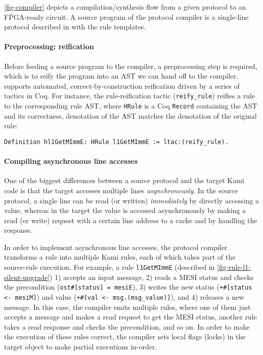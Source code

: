 \documentclass[sigplan,10pt,review,anonymous,screen]{acmart}\settopmatter{printfolios=true,printccs=false,printacmref=false}
\def\slstinline{\lstinline[basicstyle=\ttfamily\small]}
\begin{document}
\autoref{fig-compiler} depicts a compilation/synthesis flow from a given \hemiola{} protocol to an FPGA-ready circuit.
A source program of the protocol compiler is a single-line protocol described in \hemiola{} with the rule templates.

\paragraph{Preprocessing: reification}

Before feeding a \hemiola{} source program to the compiler, a preprocessing step is required, which is to reify the program into an AST we can hand off to the compiler.
\hemiola{} supports automated, correct-by-construction reification driven by a series of tactics in Coq.
For instance, the rule-reification tactic (\slstinline{reify_rule}) reifies a \hemiola{} rule to the corresponding rule AST, where \slstinline{HRule} is a Coq \slstinline{Record} containing the AST and its correctness, \ie{} denotation of the AST matches the denotation of the original rule:
\begin{lstlisting}[numbers=none, frame=none, xleftmargin=10pt]
Definition hl1GetMImmE: HRule l1GetMImmE := ltac:(reify_rule).
\end{lstlisting}

\paragraph{Compiling asynchronous line accesses}

One of the biggest differences between a source \hemiola{} protocol and the target Kami code is that the target accesses multiple lines \emph{asynchronously}.
In the source protocol, a single line can be read (or written) \emph{immediately} by directly accessing a value, whereas in the target the value is accessed asynchronously by making a read (or write) request with a certain line address to a cache and by handling the response.

In order to implement asynchronous line accesses, the protocol compiler transforms a \hemiola{} rule into multiple Kami rules, each of which takes part of the source-rule execution.
For example, a \hemiola{} rule \slstinline{l1GetMImmE} (described in \autoref{fig-rule-l1-silent-upgrade}) 1) accepts an input message, 2) reads a MESI status and checks the precondition (\slstinline{ost#[status] = mesiE}), 3) writes the new status (\slstinline{+#[status <- mesiM]}) and value (\slstinline{+#[val <- msg.(msg_value)]}), and 4) releases a new message.
In this case, the compiler emits multiple rules, where one of them just accepts a message and makes a read request to get the MESI status, another rule takes a read response and checks the precondition, and so on.
In order to make the execution of these rules correct, the compiler sets local flags (locks) in the target object to make partial executions in-order.
\end{document}

